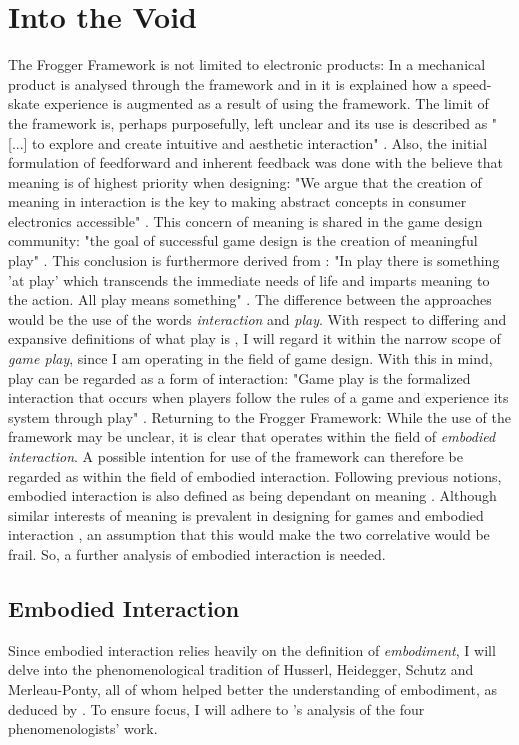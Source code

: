 \section{Into the Void}
The Frogger Framework is not limited to electronic products: In  a mechanical product is analysed through the framework and in  it is explained how a speed-skate experience is augmented as a result of using the framework. The limit of the framework is, perhaps purposefully, left unclear and its use is described as "[...] to explore and create intuitive and aesthetic interaction" \cite[p. 22]{transbehav}. Also, the initial formulation of feedforward and inherent feedback was done with the believe that meaning is of highest priority when designing: "We argue that the creation of meaning in interaction is the key to making abstract concepts in consumer electronics accessible" \cite[p. 2]{howdonald}. This concern of meaning is shared in the game design community: "the goal of successful game design is the creation of meaningful play" \cite[ch. 3, p. 3]{salen}. This conclusion is furthermore derived from \cite{huizinga}: "In play there is something 'at play' which transcends the immediate needs of life and imparts meaning to the action. All play means something" \cite[p. 1]{huizinga}. The difference between the approaches would be the use of the words \textit{interaction} and \textit{play}. With respect to differing and expansive definitions of what play is \cite{huizinga, sicartplay, salen}, I will regard it within the narrow scope of \textit{game play}, since I am operating in the field of game design. With this in mind, play can be regarded as a form of interaction: "Game play is the formalized interaction that occurs when players follow the rules of a game and experience its system through play" \cite[ch. 22, p. 3]{salen}.
Returning to the Frogger Framework: While the use of the framework may be unclear, it is clear that  operates within the field of \textit{embodied interaction}. A possible intention for use of the framework can therefore be regarded as within the field of embodied interaction. Following previous notions, embodied interaction is also defined as being dependant on meaning \cite[p. 126]{dourish}. Although similar interests of meaning is prevalent in designing for games \cite{salen} and embodied interaction \cite{dourish}, an assumption that this would make the two correlative would be frail. So, a further analysis of embodied interaction is needed.

\subsection{Embodied Interaction}
Since embodied interaction relies heavily on the definition of \textit{embodiment}, I will delve into the phenomenological tradition of Husserl, Heidegger, Schutz and Merleau-Ponty, all of whom helped better the understanding of embodiment, as deduced by . To ensure focus, I will adhere to \citeauthor{dourish}'s \citeyear{dourish} analysis of the four phenomenologists' work.
